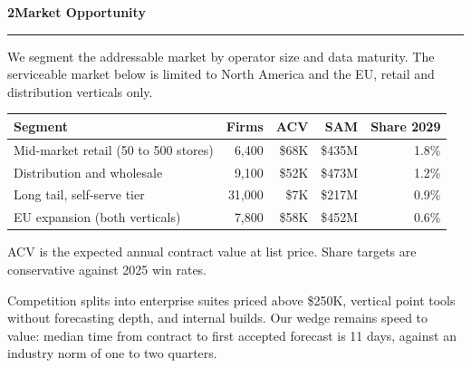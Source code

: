 \documentclass[11pt]{article}
\begin{document}
{\LARGE\bfseries\color{accent}2\quad Market Opportunity}\\[-4pt]
{\color{gold}\rule{\linewidth}{1.5pt}}

We segment the addressable market by operator size and data maturity. The
serviceable market below is limited to North America and the EU, retail
and distribution verticals only.

\begin{tabularx}{\textwidth}{@{}Xrrrr@{}}
  \toprule
  \rowcolor{white}
  {\bfseries Segment} & {\bfseries Firms} & {\bfseries ACV} &
  {\bfseries SAM} & {\bfseries Share 2029}\\
  \midrule
  Mid-market retail (50 to 500 stores) & 6,400 & \$68K & \$435M & 1.8\%\\
  Distribution and wholesale & 9,100 & \$52K & \$473M & 1.2\%\\
  Long tail, self-serve tier & 31,000 & \$7K & \$217M & 0.9\%\\
  EU expansion (both verticals) & 7,800 & \$58K & \$452M & 0.6\%\\
  \bottomrule
\end{tabularx}

\vspace{4pt}
{\color{inkgray}\small ACV is the expected annual contract value at list
price. Share targets are conservative against 2025 win rates.}

Competition splits into enterprise suites priced above \$250K, vertical
point tools without forecasting depth, and internal builds. Our wedge
remains speed to value: median time from contract to first accepted
forecast is 11 days, against an industry norm of one to two quarters.
\end{document}
